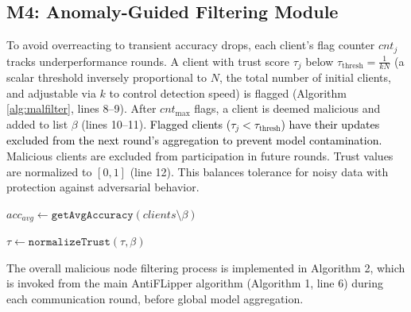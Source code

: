 \documentclass[conference]{IEEEtran}
\begin{document}
\subsection{M4: Anomaly-Guided Filtering Module}
To avoid overreacting to transient accuracy drops, each client's flag counter $cnt_j$ tracks underperformance rounds. A client with trust score $\tau_j$ below $\tau_{\text{thresh}} = \frac{1}{kN}$ (a scalar threshold inversely proportional to $N$, the total number of initial clients, and adjustable via $k$ to control detection speed) is flagged (Algorithm \ref{alg:malfilter}, lines 8--9). After $cnt_{\text{max}}$ flags, a client is deemed malicious and added to list $\beta$ (lines 10--11). \textcolor{black}{Flagged clients ($\tau_j < \tau_{\text{thresh}}$) have their updates excluded from the next round's aggregation to prevent model contamination.} Malicious clients are excluded from participation in future rounds. Trust values are normalized to $[0, 1]$ (line 12). This balances tolerance for noisy data with protection against adversarial behavior.

\IncMargin{1em}
\setlength{\textfloatsep}{0pt}
\begin{algorithm}[t]
  \caption{\texttt{MalNodeFilter()}}\label{alg:malfilter}
  \Indm 
  \Indp
  \BlankLine
  
  $acc_{avg} \leftarrow \texttt{getAvgAccuracy}(clients \setminus \beta)$\\
  

  
      
    
  
  $\tau \leftarrow \texttt{normalizeTrust}(\tau, \beta)$\\

\end{algorithm}
\DecMargin{1em}
The overall malicious node filtering process is implemented in Algorithm 2, which is invoked from the main AntiFLipper algorithm (Algorithm 1, line 6) during each communication round, before global model aggregation.
\end{document}
